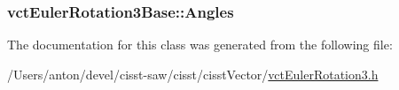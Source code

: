\subsubsection[{Angles}]{ vct\+Euler\+Rotation3\+Base\+::\+Angles\hspace{0.3cm}{\ttfamily [protected]}}\label{classvct_euler_rotation3_base_a203faf33e57587d98e65a216d186288c}


The documentation for this class was generated from the following file\+:\begin{DoxyCompactItemize}
\item 
/\+Users/anton/devel/cisst-\/saw/cisst/cisst\+Vector/\hyperlink{vct_euler_rotation3_8h}{vct\+Euler\+Rotation3.\+h}\end{DoxyCompactItemize}
